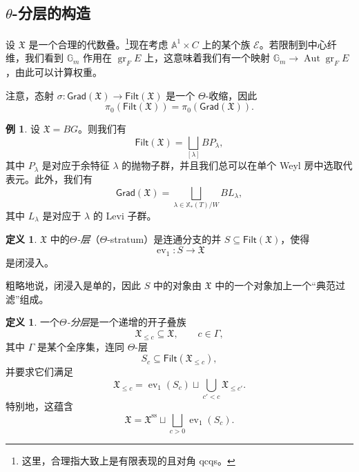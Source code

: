\documentclass{amsart}
\theoremstyle{definition}
\newtheorem{defn}[thm]{定义}
\newtheorem{exm}[thm]{例}
\theoremstyle{remark}
\theoremstyle{plain}
\theoremstyle{definition}
\theoremstyle{remark}
\newcommand{\A}{\mathbb{A}}
\newcommand{\G}{\mathbb{G}}
\newcommand{\mc}[1]{\mathcal{#1}}
\newcommand{\mf}[1]{\mathfrak{#1}}
\newcommand{\mr}[1]{\mathrm{#1}}
\newcommand{\on}[1]{\operatorname{#1}}
\newcommand{\ms}[1]{\mathsf{#1}}
\newcommand{\1}{\mathbf{1}}
\newcommand{\2}{\mathbf{2}}
\newcommand{\3}{\mathbf{3}}
\DeclareMathOperator{\Aut}{Aut}
\DeclareMathOperator{\ev}{ev}
\begin{document}
\subsection{\texorpdfstring{$\theta$-分层的构造}{Construction of Theta-stratifications}}%
\label{sub:Construction of Theta-stratifications}

设 \(\mf{X}\) 是一个合理的代数叠。\footnote{这里，合理指大致上是有限表现的且对角 qcqs。}现在考虑 \(\A^1 \times C\) 上的某个族 \(\mc{E}\)。若限制到中心纤维，我们看到 \(\G_m\) 作用在 \(\on{gr}_F E\) 上，这意味着我们有一个映射 \(\G_m \to \Aut \on{gr}_F E\)，由此可以计算权重。

注意，态射 \(\sigma \colon \ms{Grad}(\mf{X}) \to \ms{Filt}(\mf{X})\) 是一个 \(\Theta\)-收缩，因此
\[ \pi_0(\ms{Filt}(\mf{X})) = \pi_0(\ms{Grad}(\mf{X})). \]

\begin{exm}
    设 \(\mf{X} = BG\)。则我们有
    \[\ms{Filt}(\mf{X}) = \bigsqcup_{[\lambda]} B P_{\lambda}, \]
    其中 \(P_{\lambda}\) 是对应于余特征 \(\lambda\) 的抛物子群，并且我们总可以在单个 Weyl 房中选取代表元。此外，我们有
    \[ \ms{Grad}(\mf{X}) = \bigsqcup_{\lambda \in \mathbb{X}_*(T)/W} B L_{\lambda}, \]
    其中 \(L_{\lambda}\) 是对应于 \(\lambda\) 的 Levi 子群。
\end{exm}

\begin{defn}
    \(\mf{X}\) 中的\textit{\(\Theta\)-层}（\(\Theta\)-stratum）是连通分支的并 \(S \subseteq \ms{Filt}(\mf{X})\)，使得
    \[ \ev_1 \colon S \to \mf{X} \]
    是闭浸入。
\end{defn}

粗略地说，闭浸入是单的，因此 \(S\) 中的对象由 \(\mf{X}\) 中的一个对象加上一个``典范过滤''组成。

\begin{defn}
    一个\textit{\(\Theta\)-分层}是一个递增的开子叠族
    \[ \mf{X}_{\leq c} \subseteq \mf{X}, \qquad c \in \Gamma, \]
    其中 \(\Gamma\) 是某个全序集，连同 \(\Theta\)-层
    \[ S_c \subseteq \ms{Filt}(\mf{X}_{\leq c}), \]
    并要求它们满足
    \[ \mf{X}_{\leq c} = \ev_1(S_c) \sqcup \bigcup_{c' < c} \mf{X}_{\leq c'}. \]
    特别地，这蕴含
    \[ \mf{X} = \mf{X}^{\mr{ss}} \sqcup \bigsqcup_{c > 0} \ev_1(S_c). \]
\end{defn}
\end{document}
